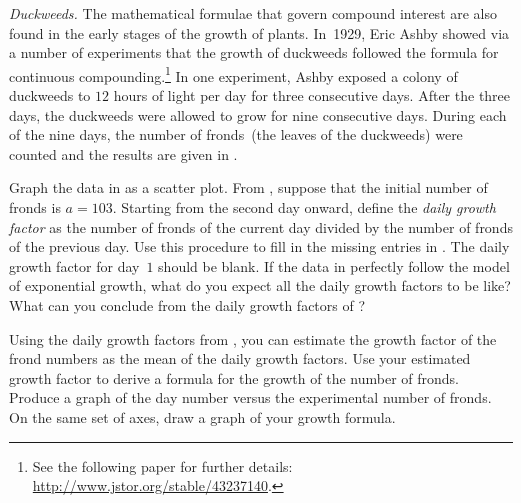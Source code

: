 \documentclass[a4paper,oneside,12pt]{article}
\begin{document}
\begin{problem}
\begin{table}[!htbp]
\centering

\caption{%
  The experimental number of fronds in a colony of duckweeds, counted
  each day for nine consecutive days.  Before the first day, the
  colony had been exposed to $12$ hours of light per day for three
  consecutive days.  The missing entries should contain the daily
  growth factors.
}
\label{tab:exponential:duckweed_frond12_missing}
\end{table}

\item\label{prob:exponential:duckweeds}
  \emph{Duckweeds.}
  The mathematical formulae that govern compound interest are also
  found in the early stages of the growth of plants.  In~1929, Eric
  Ashby showed via a number of experiments that the growth of
  duckweeds followed the formula for continuous compounding.\footnote{
    See the following paper for further details:
    \url{http://www.jstor.org/stable/43237140}.
  }
  In one experiment, Ashby exposed a colony of duckweeds to $12$ hours
  of light per day for three consecutive days.  After the three days,
  the duckweeds were allowed to grow for nine consecutive days.
  During each of the nine days, the number of fronds~(the leaves of
  the duckweeds) were counted and the results are given in
  .
  \begin{packedenum}
  \item\label{subprob:exponential:duckweeds_growth_factor}
    Graph the data in 
    as a scatter plot.  From
    , suppose that the
    initial number of fronds is $a = 103$.  Starting from the second
    day onward, define the \emph{daily growth factor} as the number of
    fronds of the current day divided by the number of fronds of the
    previous day.  Use this procedure to fill in the missing entries
    in .  The daily
    growth factor for day~$1$ should be blank.  If the data in
     perfectly follow
    the model of exponential growth, what do you expect all the daily
    growth factors to be like?  What can you conclude from the daily
    growth factors of
    ?

  \item\label{subprob:exponential:duckweeds_growth_factor_estimate}
    Using the daily growth factors
    from , you can
    estimate the growth factor of the frond numbers as the mean of the
    daily growth factors.  Use your estimated growth factor to derive
    a formula for the growth of the number of fronds.  Produce a graph
    of the day number versus the experimental number of fronds.  On
    the same set of axes, draw a graph of your growth formula.


\end{packedenum}
\end{problem}
\end{document}
